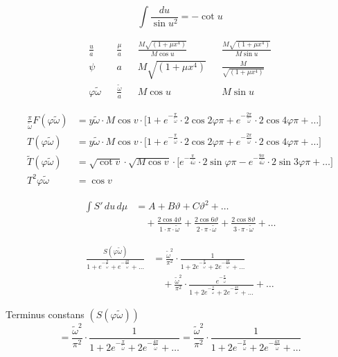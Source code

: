 \documentclass[10pt,a4paper]{article}
\begin{document}
\[
\int\!\frac{du}{\sin u^2} = -\cot u
\]

\begin{align*}
\frac{u}{a} && \frac{\mu}{a} && \frac{M\sqrt{(1+\mu x^4)}}{M\cos u} && \frac{M\sqrt{(1+\mu x^4)}}{M\sin u}\\
\psi && a && M\sqrt{(1+\mu x^4)} && \frac{M}{\sqrt{(1+\mu x^4)}}\\
\varphi\tilde{\omega} && \frac{\tilde{\omega}}{a} && M\cos u && M\sin u
\end{align*}

\begin{align*}
\frac{\pi}{\tilde{\omega}}F(\varphi\tilde{\omega}) &= y\tilde{\omega}\cdot M\cos v\cdot\bigl[1+e^{-\frac{\pi}{\tilde{\omega}}}\cdot 2\cos 2\varphi\pi + e^{-\frac{2\pi}{\tilde{\omega}}}\cdot 2\cos 4\varphi\pi + \ldots\bigr]\\
T(\varphi\tilde{\omega}) &= y\tilde{\omega}\cdot M\cos v\cdot\bigl[1+e^{-\frac{\pi}{\tilde{\omega}}}\cdot 2\cos 2\varphi\pi + e^{-\frac{2\pi}{\tilde{\omega}}}\cdot 2\cos 4\varphi\pi + \ldots\bigr]\\
\tilde{T}(\varphi\tilde{\omega}) &= \sqrt{\cot v}\cdot\sqrt{M\cos v}\cdot\bigl[e^{-\frac{\pi}{4\tilde{\omega}}}\cdot 2\sin\varphi\pi - e^{-\frac{9\pi}{4\tilde{\omega}}}\cdot 2\sin 3\varphi\pi + \ldots\bigr]\\
T^2\varphi\tilde{\omega} &= \cos v
\end{align*}

\begin{align*}
\int\!S'\,du\,d\mu &= A + B\vartheta + C\vartheta^2 + \ldots\\
&\quad + \tfrac{2\cos 4\vartheta}{1\cdot\pi\cdot\tilde{\omega}} + \tfrac{2\cos 6\vartheta}{2\cdot\pi\cdot\tilde{\omega}} + \tfrac{2\cos 8\vartheta}{3\cdot\pi\cdot\tilde{\omega}} + \ldots
\end{align*}

\begin{align*}
\frac{S(\varphi\tilde{\omega})}{1+e^{-\frac{\pi}{\tilde{\omega}}}+e^{-\frac{2\pi}{\tilde{\omega}}}+\ldots} &= \frac{\tilde{\omega}^2}{\pi^2}\cdot\frac{1}{1+2e^{-\frac{\pi}{\tilde{\omega}}}+2e^{-\frac{4\pi}{\tilde{\omega}}}+\ldots}\\
&\quad + \frac{\tilde{\omega}^2}{\pi^2}\cdot\frac{e^{-\frac{\pi}{\tilde{\omega}}}}{1+2e^{-\frac{\pi}{\tilde{\omega}}}+2e^{-\frac{4\pi}{\tilde{\omega}}}+\ldots} + \ldots
\end{align*}

Terminus constans $(S(\varphi\tilde{\omega}))$
\[
= \frac{\tilde{\omega}^2}{\pi^2}\cdot\frac{1}{1+2e^{-\frac{\pi}{\tilde{\omega}}}+2e^{-\frac{4\pi}{\tilde{\omega}}}+\ldots} = \frac{\tilde{\omega}^2}{\pi^2}\cdot\frac{1}{1+2e^{-\frac{\pi}{\tilde{\omega}}}+2e^{-\frac{4\pi}{\tilde{\omega}}}+\ldots}
\]
\end{document}

